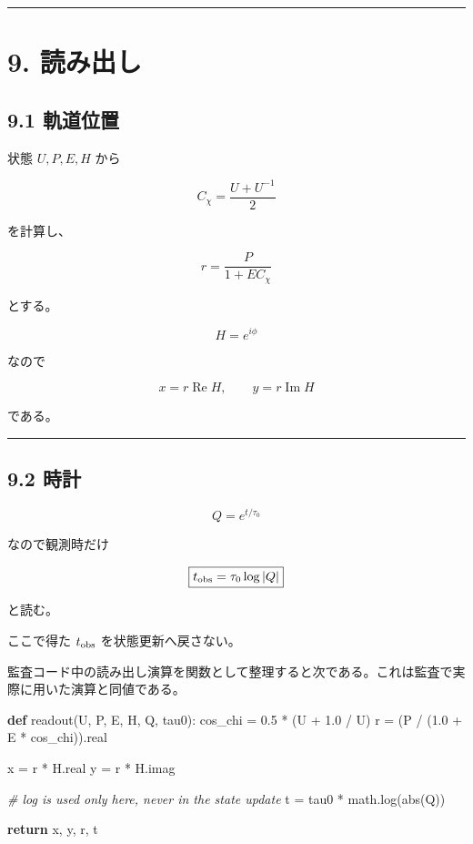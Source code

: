 \documentclass[
  a4paper,
]{ltjsarticle}
\newenvironment{Shaded}{}{}
\newcommand{\BuiltInTok}[1]{\textcolor[rgb]{0.00,0.50,0.00}{#1}}
\newcommand{\CommentTok}[1]{\textcolor[rgb]{0.38,0.63,0.69}{\textit{#1}}}
\newcommand{\ControlFlowTok}[1]{\textcolor[rgb]{0.00,0.44,0.13}{\textbf{#1}}}
\newcommand{\FloatTok}[1]{\textcolor[rgb]{0.25,0.63,0.44}{#1}}
\newcommand{\KeywordTok}[1]{\textcolor[rgb]{0.00,0.44,0.13}{\textbf{#1}}}
\newcommand{\NormalTok}[1]{#1}
\newcommand{\OperatorTok}[1]{\textcolor[rgb]{0.40,0.40,0.40}{#1}}
\begin{document}
\begin{center}\rule{0.5\linewidth}{0.5pt}\end{center}

\section{9. 読み出し}\label{ux8aadux307fux51faux3057}

\subsection{9.1 軌道位置}\label{ux8eccux9053ux4f4dux7f6e}

状態 \(U,P,E,H\) から

\[
C_\chi=\frac{U+U^{-1}}2
\]

を計算し、

\[
\boxed{
r=\frac{P}{1+EC_\chi}
}
\]

とする。

\[
H=e^{i\phi}
\]

なので

\[
\boxed{
x=r\operatorname{Re}H,
\qquad
y=r\operatorname{Im}H
}
\]

である。

\begin{center}\rule{0.5\linewidth}{0.5pt}\end{center}

\subsection{9.2 時計}\label{ux6642ux8a08}

\[
Q=e^{t/\tau_0}
\]

なので観測時だけ

\[
\boxed{
t_{\rm obs}
=\tau_0\log |Q|
}
\]

と読む。

ここで得た \(t_{\rm obs}\) を状態更新へ戻さない。

監査コード中の読み出し演算を関数として整理すると次である。これは監査で実際に用いた演算と同値である。

\begin{Shaded}
\begin{Highlighting}[]
\KeywordTok{def}\NormalTok{ readout(U, P, E, H, Q, tau0):}
\NormalTok{    cos\_chi }\OperatorTok{=} \FloatTok{0.5} \OperatorTok{*}\NormalTok{ (U }\OperatorTok{+} \FloatTok{1.0} \OperatorTok{/}\NormalTok{ U)}
\NormalTok{    r }\OperatorTok{=}\NormalTok{ (P }\OperatorTok{/}\NormalTok{ (}\FloatTok{1.0} \OperatorTok{+}\NormalTok{ E }\OperatorTok{*}\NormalTok{ cos\_chi)).real}

\NormalTok{    x }\OperatorTok{=}\NormalTok{ r }\OperatorTok{*}\NormalTok{ H.real}
\NormalTok{    y }\OperatorTok{=}\NormalTok{ r }\OperatorTok{*}\NormalTok{ H.imag}

    \CommentTok{\# log is used only here, never in the state update}
\NormalTok{    t }\OperatorTok{=}\NormalTok{ tau0 }\OperatorTok{*}\NormalTok{ math.log(}\BuiltInTok{abs}\NormalTok{(Q))}

    \ControlFlowTok{return}\NormalTok{ x, y, r, t}
\end{Highlighting}
\end{Shaded}
\end{document}
